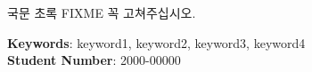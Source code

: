 \documentclass[doctor]{snuee}
\begin{document}


%
\begin{summary}
	\par    %
	국문 초록 FIXME 꼭 고쳐주십시오. 
	\vfill
\begin{minipage}[t][20mm][b]{\textwidth}
	{\bfseries Keywords}: keyword1, keyword2, keyword3, keyword4 \\ %
	{\bfseries Student Number}: 2000-00000\\                        %
\end{minipage}
\end{summary}
\changepage {15mm}{}{}{}{}{-30mm}{}{}{15mm} %


\end{document}
